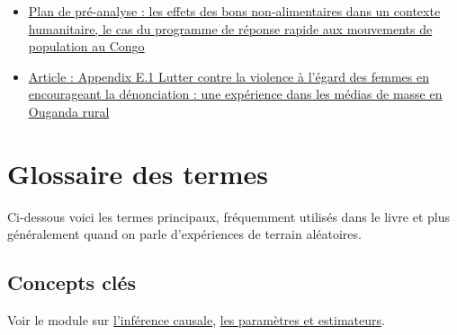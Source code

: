 \documentclass[12pt,]{book}
\begin{document}
\begin{itemize}
\item
  \href{https://osf.io/eutx7/}{Plan de pré-analyse : les effets des bons non-alimentaires dans un contexte humanitaire, le cas du programme de réponse rapide aux mouvements de population au Congo}
\item
  \href{http://jasper-cooper.com/papers/Green_et_al.pdf}{Article : Appendix E.1 Lutter contre la violence à l'égard des femmes en encourageant la dénonciation : une expérience dans les médias de masse en Ouganda rural}
\end{itemize}

\cleardoublepage

\hypertarget{appendix-appendix}{%
\appendix}


\hypertarget{glossaire-des-termes}{%
\chapter{Glossaire des termes}\label{glossaire-des-termes}}

Ci-dessous voici les termes principaux, fréquemment utilisés dans le livre et plus généralement quand on parle d'expériences de terrain aléatoires.

\hypertarget{concepts-cluxe9s}{%
\section{Concepts clés}\label{concepts-cluxe9s}}

Voir le module sur \href{inférence-causale.html}{l'inférence causale}, \href{paramètres-et-estimateurs.html}{les paramètres et estimateurs}.
\end{document}
